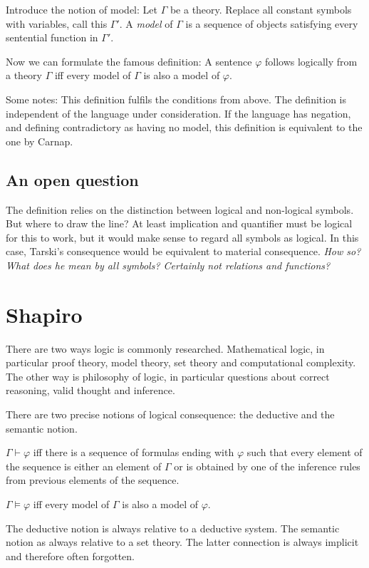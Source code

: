 \documentclass[a4paper]{article}
\begin{document}
Introduce the notion of model:  Let $\Gamma$ be a theory. Replace all constant
symbols with variables, call this $\Gamma'$.  A \emph{model} of $\Gamma$ is a
sequence of objects satisfying every sentential function in $\Gamma'$.

Now we can formulate the famous definition: A sentence $\varphi$ follows
logically from a theory $\Gamma$ iff every model of $\Gamma$ is also a model of
$\varphi$.

Some notes: This definition fulfils the conditions from above.  The definition is
independent of the language under consideration.  If the language has negation,
and defining contradictory as having no model, this definition is equivalent to
the one by Carnap.

\subsection{An open question}

The definition relies on the distinction between logical and non-logical
symbols.  But where to draw the line?  At least implication and quantifier must
be logical for this to work, but it would make sense to regard all symbols as
logical.  In this case, Tarski's consequence would be equivalent to material
consequence.  \emph{How so? What does he mean by \emph{all symbols}? Certainly
not relations and functions?}

\section{Shapiro}

There are two ways logic is commonly researched.  Mathematical logic, in
particular proof theory, model theory, set theory and computational complexity.
The other way is philosophy of logic, in particular questions about correct
reasoning, valid thought and inference.

There are two precise notions of logical consequence: the deductive and the
semantic notion.

$\Gamma \vdash \varphi$ iff there is a sequence of formulas ending with
$\varphi$ such that every element of the sequence is either an element of
$\Gamma$ or is obtained by one of the inference rules from previous elements of
the sequence.

$\Gamma \models \varphi$ iff every model of $\Gamma$ is also a model of
$\varphi$.

The deductive notion is always relative to a deductive system.  The semantic
notion as always relative to a set theory.  The latter connection is always
implicit and therefore often forgotten.
\end{document}
